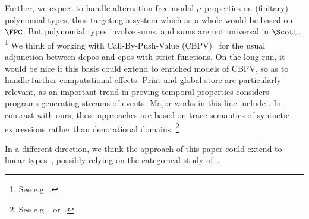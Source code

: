 Further, we expect to handle alternation-free modal $\mu$-properties
on (finitary) polynomial types, thus targeting a system which as a whole
would be based on $\FPC$.
But polynomial types involve sums,
and sums are not universal in $\Scott$.%
\footnote{See e.g. \cite[Exercise 6.1.10]{ac98book}.}
We think of working with Call-By-Push-Value (CBPV)~\cite{levy03book,levy22siglog}
for the usual adjunction between dcpos and cpos with strict functions.
On the long run, it would be nice if this basis could extend to
enriched models of CBPV,
so as to handle further computational effects.
Print and global store are particularly relevant,
as an important trend in proving temporal properties
considers programs generating streams of events.
Major works in this line include
\cite{ssv08jfp,hc14lics,hl17lics,nukt18lics,kt14lics,ust17popl,nukt18lics,%
su23popl}.
In contrast with ours, these approaches are based on trace semantics
of syntactic expressions rather than denotational domains.%
\footnote{See e.g.~\cite[Theorem 4.1 (and Figure 6)]{nukt18lics}
or~\cite[Theorem 1 (and Definition 20 from the full version)]{su23popl}.}


In a different direction, we think the approach of this paper
could extend to linear types~\cite{hjk00mscs,nw03concur,winskel04llcs},
possibly relying on the categorical study of~\cite{bf06book}.





